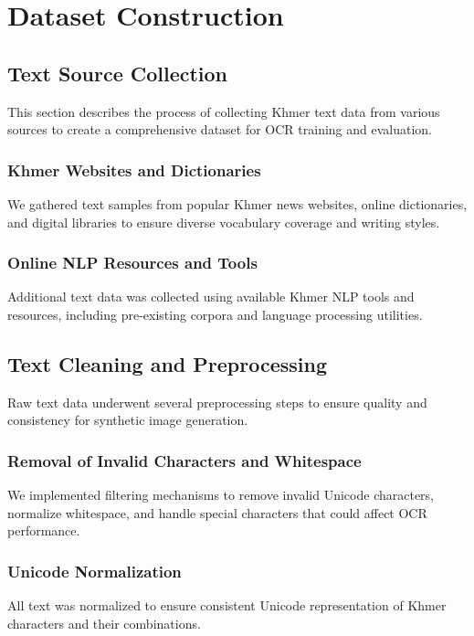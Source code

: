 
\chapter{Dataset Construction}
\label{ch:dataset}

\section{Text Source Collection}
\label{sec:text-source}
This section describes the process of collecting Khmer text data from various sources to create a comprehensive dataset for OCR training and evaluation.

\subsection{Khmer Websites and Dictionaries}
\label{subsec:websites}
We gathered text samples from popular Khmer news websites, online dictionaries, and digital libraries to ensure diverse vocabulary coverage and writing styles.

\subsection{Online NLP Resources and Tools} 
\label{subsec:nlp-tools}
Additional text data was collected using available Khmer NLP tools and resources, including pre-existing corpora and language processing utilities.

\section{Text Cleaning and Preprocessing}
\label{sec:preprocessing}
Raw text data underwent several preprocessing steps to ensure quality and consistency for synthetic image generation.

\subsection{Removal of Invalid Characters and Whitespace}
\label{subsec:cleaning}
We implemented filtering mechanisms to remove invalid Unicode characters, normalize whitespace, and handle special characters that could affect OCR performance.

\subsection{Unicode Normalization}
\label{subsec:unicode}
All text was normalized to ensure consistent Unicode representation of Khmer characters and their combinations.

